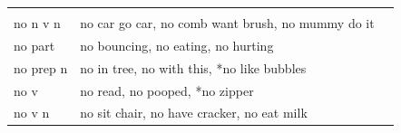 \documentclass[man]{apa6}
\begin{document}
\begin{longtable}[]{@{}lll@{}}
\begin{minipage}[t]{0.27\columnwidth}
\strut
\end{minipage}\tabularnewline
\begin{minipage}[t]{0.21\columnwidth}\raggedright\strut
no n v n\strut
\end{minipage} & \begin{minipage}[t]{0.43\columnwidth}\raggedright\strut
no car go car, no comb want brush, no mummy do it\strut
\end{minipage} & \begin{minipage}[t]{0.27\columnwidth}\raggedright\strut
\strut
\end{minipage}\tabularnewline
\begin{minipage}[t]{0.21\columnwidth}\raggedright\strut
no part\strut
\end{minipage} & \begin{minipage}[t]{0.43\columnwidth}\raggedright\strut
no bouncing, no eating, no hurting\strut
\end{minipage} & \begin{minipage}[t]{0.27\columnwidth}\raggedright\strut
\strut
\end{minipage}\tabularnewline
\begin{minipage}[t]{0.21\columnwidth}\raggedright\strut
no prep n\strut
\end{minipage} & \begin{minipage}[t]{0.43\columnwidth}\raggedright\strut
no in tree, no with this, *no like bubbles\strut
\end{minipage} & \begin{minipage}[t]{0.27\columnwidth}\raggedright\strut
\strut
\end{minipage}\tabularnewline
\begin{minipage}[t]{0.21\columnwidth}\raggedright\strut
no v\strut
\end{minipage} & \begin{minipage}[t]{0.43\columnwidth}\raggedright\strut
no read, no pooped, *no zipper\strut
\end{minipage} & \begin{minipage}[t]{0.27\columnwidth}\raggedright\strut
\strut
\end{minipage}\tabularnewline
\begin{minipage}[t]{0.21\columnwidth}\raggedright\strut
no v n\strut
\end{minipage} & \begin{minipage}[t]{0.43\columnwidth}\raggedright\strut
no sit chair, no have cracker, no eat milk\strut
\end{minipage} & \begin{minipage}[t]{0.27\columnwidth}\raggedright\strut

\end{minipage}
\end{longtable}
\end{document}
